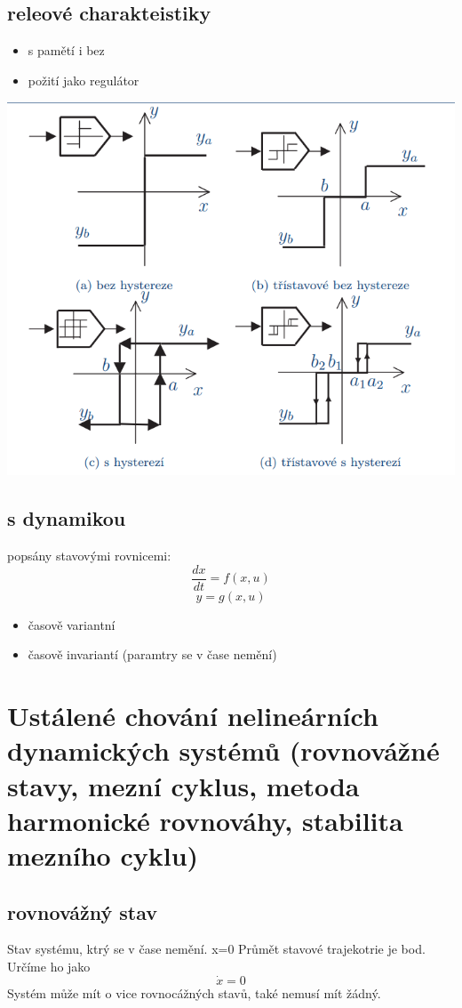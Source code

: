 \subsection*{releové charakteistiky}
\begin{itemize}
    \item s pamětí i bez
    \item požití jako regulátor
\end{itemize}
\includegraphics*{img/rele.png}


\subsection{s dynamikou}
popsány stavovými rovnicemi:
\[
    \frac{dx}{dt}=f(x,u)\]
    \[y=g(x,u)\]


\begin{itemize}   
    \item časově variantní
    \item časově invariantí (paramtry se v čase nemění)
\end{itemize}

\section{Ustálené chování nelineárních dynamických systémů (rovnovážné stavy, mezní cyklus, metoda
harmonické rovnováhy, stabilita mezního cyklu)}

\subsection{rovnovážný stav}
Stav systému, ktrý se v čase nemění. x=0 Průmět stavové trajekotrie je bod. Určíme
ho jako \[ \dot{x} = 0 \]
Systém může mít o vice rovnocážných stavů, také nemusí mít žádný.

